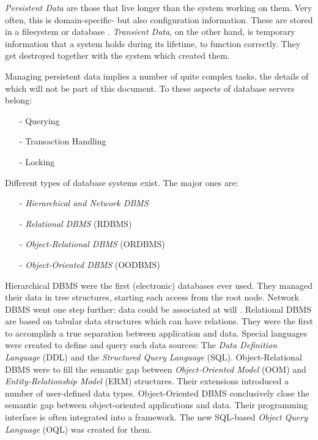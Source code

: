 \emph{Persistent Data} are those that live longer than the system working on them.
Very often, this is domain-specific- but also configuration information. These
are stored in a filesystem or database \cite{zimmermann}. \emph{Transient Data},
on the other hand, is temporary information that a system holds during its
lifetime, to function correctly. They get destroyed together with the system
which created them.

Managing persistent data implies a number of quite complex tasks, the details of
which will not be part of this document. To these aspects of database servers
belong:

\begin{itemize}
    \item[-] Querying
    \item[-] Transaction Handling
    \item[-] Locking
\end{itemize}

Different types of database systems exist. The major ones are:

\begin{itemize}
    \item[-] \emph{Hierarchical and Network DBMS}
    \item[-] \emph{Relational DBMS} (RDBMS)
    \item[-] \emph{Object-Relational DBMS} (ORDBMS)
    \item[-] \emph{Object-Oriented DBMS} (OODBMS)
\end{itemize}

Hierarchical DBMS were the first (electronic) databases ever used. They managed
their data in tree structures, starting each access from the root node. Network
DBMS went one step further: data could be associated at will \cite[p. 128]{zimmermann}.
Relational DBMS are based on tabular data structures which can have relations.
They were the first to accomplish a true separation between application and data.
Special languages were created to define and query such data sources: The
\emph{Data Definition Language} (DDL) and the \emph{Structured Query Language}
(SQL). Object-Relational DBMS were to fill the semantic gap between
\emph{Object-Oriented Model} (OOM) and \emph{Entity-Relationship Model} (ERM)
structures. Their extensions introduced a number of user-defined data types.
Object-Oriented DBMS conclusively close the semantic gap between object-oriented
applications and data. Their programming interface is often integrated into a
framework. The new SQL-based \emph{Object Query Language} (OQL)
\cite[p. 138]{zimmermann} was created for them.

